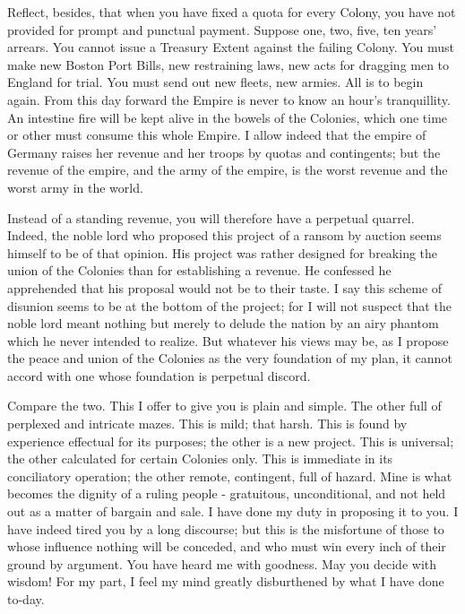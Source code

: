 Reflect, besides, that when you have fixed a quota for every Colony, you have not provided for prompt and punctual payment. Suppose one, two, five, ten years’ arrears. You cannot issue a Treasury Extent against the failing Colony. You must make new Boston Port Bills, new restraining laws, new acts for dragging men to England for trial. You must send out new fleets, new armies. All is to begin again. From this day forward the Empire is never to know an hour’s tranquillity. An intestine fire will be kept alive in the bowels of the Colonies, which one time or other must consume this whole Empire. I allow indeed that the empire of Germany raises her revenue and her troops by quotas and contingents; but the revenue of the empire, and the army of the empire, is the worst revenue and the worst army in the world.\par

Instead of a standing revenue, you will therefore have a perpetual quarrel. Indeed, the noble lord who proposed this project of a ransom by auction seems himself to be of that opinion. His project was rather designed for breaking the union of the Colonies than for establishing a revenue. He confessed he apprehended that his proposal would not be to their taste. I say this scheme of disunion seems to be at the bottom of the project; for I will not suspect that the noble lord meant nothing but merely to delude the nation by an airy phantom which he never intended to realize. But whatever his views may be, as I propose the peace and union of the Colonies as the very foundation of my plan, it cannot accord with one whose foundation is perpetual discord.\par

Compare the two. This I offer to give you is plain and simple. The other full of perplexed and intricate mazes. This is mild; that harsh. This is found by experience effectual for its purposes; the other is a new project. This is universal; the other calculated for certain Colonies only. This is immediate in its conciliatory operation; the other remote, contingent, full of hazard. Mine is what becomes the dignity of a ruling people - gratuitous, unconditional, and not held out as a matter of bargain and sale. I have done my duty in proposing it to you. I have indeed tired you by a long discourse; but this is the misfortune of those to whose influence nothing will be conceded, and who must win every inch of their ground by argument. You have heard me with goodness. May you decide with wisdom! For my part, I feel my mind greatly disburthened by what I have done to-day.\par

